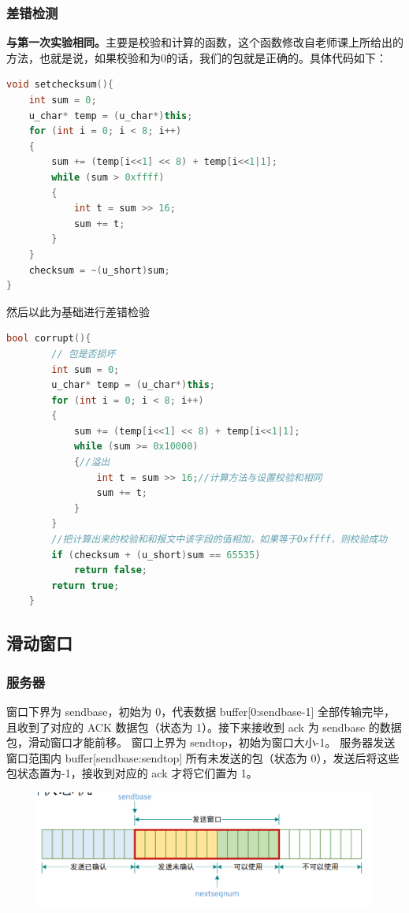 \documentclass[UTF8,a4paper,10pt]{ctexart}
\begin{document}
\subsubsection{差错检测}
\textbf{与第一次实验相同。}主要是校验和计算的函数，这个函数修改自老师课上所给出的方法，也就是说，如果校验和为0的话，我们的包就是正确的。具体代码如下：
\begin{lstlisting}[title=校验和计算,frame=trbl,language={C++}]
void setchecksum(){
    int sum = 0;
    u_char* temp = (u_char*)this;
    for (int i = 0; i < 8; i++)
    {
        sum += (temp[i<<1] << 8) + temp[i<<1|1];
        while (sum > 0xffff)
        {
            int t = sum >> 16;  
            sum += t;
        }
    }
    checksum = ~(u_short)sum;  
}
\end{lstlisting}
然后以此为基础进行差错检验
\begin{lstlisting}[title=差错检验,frame=trbl,language={C++}]
bool corrupt(){
        // 包是否损坏
        int sum = 0;
        u_char* temp = (u_char*)this;
        for (int i = 0; i < 8; i++)
        {
            sum += (temp[i<<1] << 8) + temp[i<<1|1];
            while (sum >= 0x10000)
            {//溢出
                int t = sum >> 16;//计算方法与设置校验和相同
                sum += t;
            }
        }
        //把计算出来的校验和和报文中该字段的值相加，如果等于0xffff，则校验成功
        if (checksum + (u_short)sum == 65535)
            return false;
        return true;
    }
\end{lstlisting}
\subsection{滑动窗口}
\subsubsection{服务器}
窗口下界为 sendbase，初始为 0，代表数据 buffer[0:sendbase-1] 全部传输完毕，且收到了对应的 ACK 数据包（状态为 1）。接下来接收到 ack 为 sendbase 的数据包，滑动窗口才能前移。
窗口上界为 sendtop，初始为窗口大小-1。
服务器发送窗口范围内 buffer[sendbase:sendtop] 所有未发送的包（状态为 0），发送后将这些包状态置为-1，接收到对应的 ack 才将它们置为 1。
\begin{figure}[H]
    \centering
    \includegraphics[scale=0.6]{计网5.png}
    \label{fig:2}
\end{figure}
\end{document}
